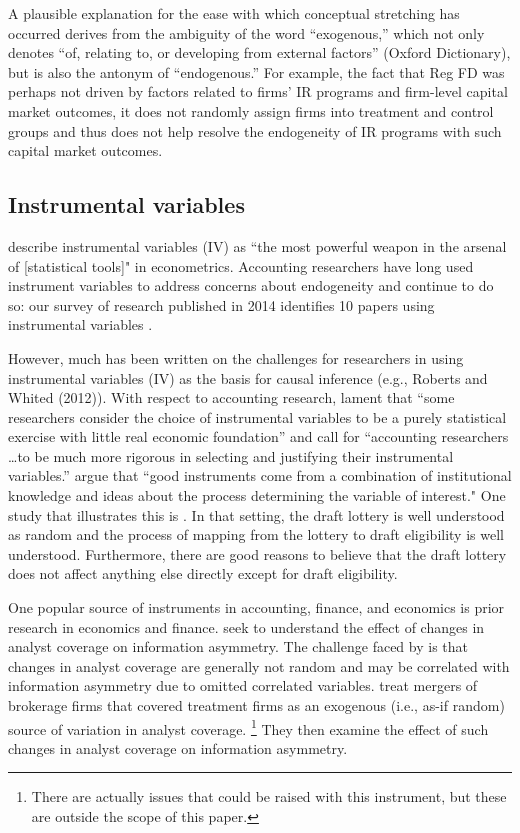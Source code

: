 \documentclass[11pt]{amsart}
\begin{document}
A plausible explanation for the ease with which conceptual stretching has occurred derives from the ambiguity of the word ``exogenous,'' which not only denotes  ``of, relating to, or developing from external factors'' (Oxford Dictionary), but is also the antonym of ``endogenous.''
For example, the fact that Reg FD was perhaps not driven by factors related to firms' IR programs and firm-level capital market outcomes, it does not randomly assign firms into treatment and control groups and thus does not help resolve the endogeneity of IR programs with such capital market outcomes.

\subsection{Instrumental variables}
\citet[p.114]{Angrist:2008vk} describe instrumental variables (IV) as ``the most powerful weapon in the arsenal of [statistical tools]" in econometrics. 
Accounting researchers have long used instrument variables to address concerns about endogeneity \citep{Larcker:2010fq} and continue to do so: our survey of research published in 2014 identifies 10 papers using instrumental variables \citep{Cannon:2014im,Cohen:2014jl,Kim:2014fm,Vermeer:2014bs,Fox:2014io,Guedhami:2013cj,Houston:2014hv,deFranco:2014ct,Erkens:2014hj,Correia:2014fp}. 

However, much has been written on the challenges for researchers in using instrumental variables (IV) as the basis for causal inference (e.g., Roberts and Whited (2012)). 
With respect to accounting research, \citet{Larcker:2010fq} lament that ``some researchers consider the choice of instrumental variables to be a purely statistical exercise with little real economic foundation'' and call for 
``accounting researchers \dots to be much more rigorous in selecting and justifying their instrumental variables.'' 
\citet[p.117]{Angrist:2008vk} argue that ``good instruments come from a combination of institutional knowledge and ideas about the process determining the variable of interest."
One study that illustrates this is \cite{Angrist:2008vk}.
In that setting, the draft lottery is well understood as random and the process of mapping from the lottery to draft eligibility is well understood.
Furthermore, there are good reasons to believe that the draft lottery does not affect anything else directly except for draft eligibility.

One popular source of instruments in accounting, finance, and economics is prior research in economics and finance.
\citet{Kelly:2012ih} seek to understand the effect of changes in analyst coverage on information asymmetry. 
The challenge faced by \citet{Kelly:2012ih} is that changes in analyst coverage are generally not random and may be correlated with information asymmetry due to omitted correlated variables.
\citet{Kelly:2012ih} treat mergers of brokerage firms that covered treatment firms as an exogenous (i.e., as-if random) source of variation in analyst coverage. \footnote{There are actually issues that could be raised with this instrument, but these are outside the scope of this paper.} They then examine the effect of such changes in analyst coverage on information asymmetry.
\end{document}
